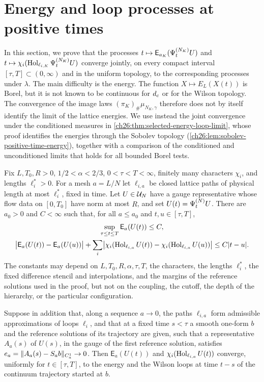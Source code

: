 \section{Energy and loop processes at positive times}\label{ch26:sec:paths}

In this section, we prove that the processes $t\mapsto\mathsf E_{a_K}(\Psi^{(N_K)}_tU)$ and $t\mapsto\chi_i(\operatorname{Hol}_{\ell_{i,K}}\Psi^{(N_K)}_tU)$ converge jointly, on every compact interval $[\tau,T]\subset(0,\infty)$ and in the uniform topology, to the corresponding processes under $\lambda$. The main difficulty is the energy. The function $X\mapsto E_L(X(t))$ is Borel, but it is not known to be continuous for $d_c$ or for the Wilson topology. The convergence of the image laws $(\pi_K)_\#\mu_{N_K,\gamma}$ therefore does not by itself identify the limit of the lattice energies. We use instead the joint convergence under the conditioned measures in \cref{ch26:thm:selected-energy-loop-limit}, whose proof identifies the energies through the Sobolev topology (\cref{ch26:lem:sobolev-positive-time-energy}), together with a comparison of the conditioned and unconditioned limits that holds for all bounded Borel tests.

\begin{lemma}\label{ch26:lem:positive-window-observable-modulus}
Fix $L,T_0,R>0$, $1/2<\alpha<2/3$, $0<\tau<T<\infty$, finitely many characters $\chi_i$, and lengths $\ell_i^*>0$. For a mesh $a=L/N$ let $\ell_{i,a}$ be closed lattice paths of physical length at most $\ell_i^*$, fixed in time. Let $U\in\mathcal U_{N}$ have a gauge representative whose flow data on $[0,T_0]$ have norm at most $R$, and set $U(t)=\Psi^{(N)}_tU$. There are $a_0>0$ and $C<\infty$ such that, for all $a\le a_0$ and $t,u\in[\tau,T]$,
\begin{equation}\label{ch26:eq:positive-window-modulus}
 \begin{gathered}
 \sup_{\tau\le t\le T}\mathsf E_a(U(t))\le C,\\
 \bigl\lvert\mathsf E_a(U(t))-\mathsf E_a(U(u))\bigr\rvert
 +\sum_i\bigl\lvert\chi_i(\operatorname{Hol}_{\ell_{i,a}}U(t))-\chi_i(\operatorname{Hol}_{\ell_{i,a}}U(u))\bigr\rvert\le C\lvert t-u\rvert.
 \end{gathered}
\end{equation}
The constants may depend on $L,T_0,R,\alpha,\tau,T$, the characters, the lengths $\ell_i^*$, the fixed difference stencil and interpolations, and the margins of the reference solutions used in the proof, but not on the coupling, the cutoff, the depth of the hierarchy, or the particular configuration.

Suppose in addition that, along a sequence $a\to0$, the paths $\ell_{i,a}$ form admissible approximations of loops $\ell_i$, and that at a fixed time $s<\tau$ a smooth one-form $b$ and the reference solutions of its trajectory are given, such that a representative $A_a(s)$ of $U(s)$, in the gauge of the first reference solution, satisfies $e_a=\lVert A_a(s)-S_ab\rVert_{C_a^1}\to0$. Then $\mathsf E_a(U(t))$ and $\chi_i(\operatorname{Hol}_{\ell_{i,a}}U(t))$ converge, uniformly for $t\in[\tau,T]$, to the energy and the Wilson loops at time $t-s$ of the continuum trajectory started at $b$.
\end{lemma}

